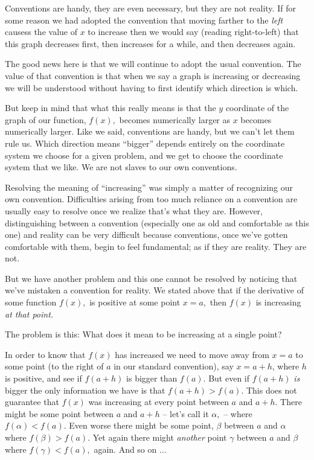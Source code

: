 \begin{Digression}
Conventions are handy, they are even necessary, but they are not
reality. If for some reason we had adopted the convention that
moving farther to the \emph{left} causess the value of $x$ to increase
then we would say (reading right-to-left) that this graph decreases
first, then increases for a while, and then decreases again.

The good news here is that  we will continue to adopt the usual
convention. The value of that convention is that when
we say a graph is increasing or decreasing we will be understood
without having to first identify which direction is which.

\alert{But} keep in mind that what this really means is that the
$y$ coordinate of the graph of our function, $f(x),$ becomes
numerically larger  as $x$ becomes numerically larger. Like we said, conventions are handy, but we can't let them
rule us. Which direction means ``bigger'' depends entirely on the
coordinate system we choose for a given problem, and we 
get to choose the coordinate system that we like. We are not slaves to
our own conventions.

Resolving the meaning of ``increasing'' was simply a matter of recognizing our own
convention.  Difficulties arising from too much reliance on a
convention are usually easy to resolve once we realize that's what
they are.  However, distinguishing between a convention (especially
one as old and comfortable as this one) and reality can be very
difficult because conventions, once we've gotten comfortable with
them, begin to feel fundamental; as if they \alert{are} reality. They are not.

But we have another problem and this one cannot be resolved by
noticing that we've mistaken a convention for reality. We stated above
that if the derivative of some function $f(x),$ is positive at some
point $x=a,$ then $f(x)$ is increasing \emph{at that point.}

The problem is this: What does it mean to be increasing at a single point?

In order to know that $f(x)$ has increased we need to move away from
$x=a$ to some point (to the right of $a$ in our standard convention),
say $x=a+h$, where $h$ is positive, and see if $f(a+h)$ is bigger than
$f(a).$ But even if $f(a+h)$ \emph{is} bigger the only information we
have is that $f(a+h)>f(a).$ This does not guarantee that $f(x)$ was
increasing at every point between $a$ and $a+h$. There might
be some point between $a$ and $a+h$ -- let's call it $\alpha,$ --
where $f(\alpha)<f(a).$ Even worse there might be some point, $\beta$
between $a$ and $\alpha$ where $f(\beta)>f(a).$ Yet again there might
\emph{another} point $\gamma$ between $a$ and $\beta$ where
$f(\gamma) < f(a),$ again. And so on $\ldots$


\end{Digression}
